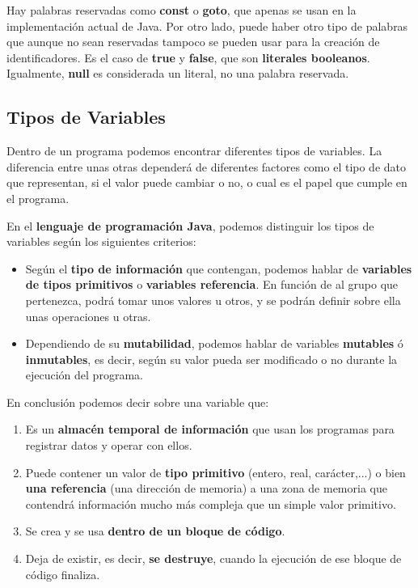 Hay palabras reservadas como \textbf{const} o \textbf{goto}, que apenas se usan en la implementación actual de Java. Por otro lado, puede haber otro tipo de palabras que aunque no sean reservadas tampoco se pueden usar para la creación de identificadores. Es el caso de \textbf{true} y \textbf{false}, que son \textbf{literales booleanos}. Igualmente, \textbf{null} es considerada un literal, no una palabra reservada.

\subsection{Tipos de Variables}
Dentro de un programa podemos encontrar diferentes tipos de variables. La diferencia entre unas otras dependerá de diferentes factores como el tipo de dato que representan, si el valor puede cambiar o no, o cual es el papel que cumple en el programa.

En el \textbf{lenguaje de programación Java}, podemos distinguir los tipos de variables según los siguientes criterios:

\begin{itemize}
    \item Según el \textbf{tipo de información} que contengan, podemos hablar de \textbf{variables de tipos primitivos} o \textbf{variables referencia}. En función de al grupo que pertenezca, podrá tomar unos valores u otros, y se podrán definir sobre ella unas operaciones u otras.

    \item Dependiendo de su \textbf{mutabilidad}, podemos hablar de variables \textbf{mutables} ó \textbf{inmutables}, es decir, según su valor pueda ser modificado o no durante la ejecución del programa.
\end{itemize}

En conclusión podemos decir sobre una variable que:

\begin{enumerate}
    \item Es un \textbf{almacén temporal de información} que usan los programas para registrar datos y operar con ellos.
    \item Puede contener un valor de \textbf{tipo primitivo} (entero, real, carácter,...) o bien \textbf{una referencia} (una dirección de memoria) a una zona de memoria que contendrá información mucho más compleja que un simple valor primitivo.
    \item Se crea y se usa \textbf{dentro de un bloque de código}.
    \item Deja de existir, es decir, \textbf{se destruye}, cuando la ejecución de ese bloque de código finaliza.
\end{enumerate}

